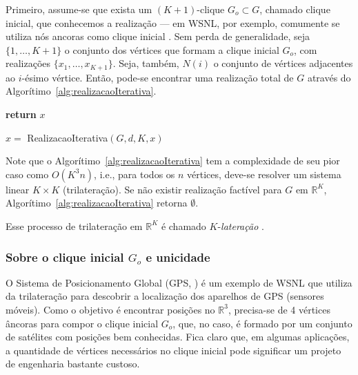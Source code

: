 Primeiro, assume-se que exista um $(K+1)$-clique $G_o \subset G$, chamado clique inicial, que conhecemos a realização --- em WSNL, por exemplo, comumente se utiliza nós ancoras como clique inicial \cite{eren2004rigidity, savvides2001dynamic}. Sem perda de generalidade, seja $\{1,\dots,K+1\}$ o conjunto dos vértices que formam a clique inicial $G_o$, com realizações $\{x_1, \dots,x_{K+1}\}$. Seja, também, $N(i)$ o conjunto de vértices adjacentes ao $i$-ésimo vértice. Então, pode-se encontrar uma realização total de $G$ através do Algorítimo~\ref{alg:realizacaoIterativa}. 
\\

\begin{algorithm}[H]
	\label{alg:realizacaoIterativa}
	\textbf{return} $x$\;
	\caption{$x =$ RealizacaoIterativa$(G,d, K, x)$ \cite{libertiEDG}}
\end{algorithm}
\vspace{0.5cm}
Note que o Algorítimo~\ref{alg:realizacaoIterativa} tem a complexidade de seu pior caso como $O(K^3n)$, i.e., para todos os $n$ vértices, deve-se resolver um sistema linear $K\times K$ (trilateração). Se não existir realização factível para $G$ em $\mathbb{R}^K$, Algorítimo~\ref{alg:realizacaoIterativa} retorna $\emptyset$.

Esse processo de trilateração em $\mathbb{R}^K$ é chamado $K$-\textit{lateração} \cite{eren2004rigidity, libertiEDG}.

\subsubsection{Sobre o clique inicial $G_o$ e unicidade \label{sec:go}}
O Sistema de Posicionamento Global (GPS,  \cite{gps}) é um exemplo de WSNL que utiliza da trilateração para descobrir a localização dos aparelhos de GPS (sensores móveis). Como o objetivo é encontrar posições no $\mathbb{R}^3$, precisa-se de 4 vértices âncoras para compor o clique inicial $G_o$, que, no caso, é formado por um conjunto de satélites com posições bem conhecidas. Fica claro que, em algumas aplicações, a quantidade de vértices necessários no clique inicial pode significar um projeto de engenharia bastante custoso.

